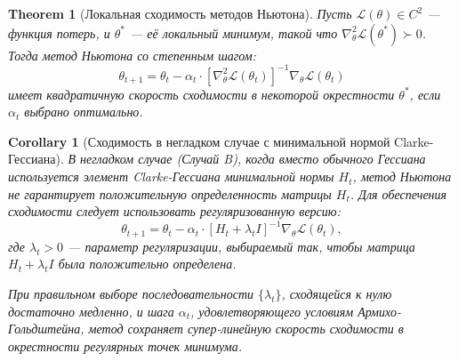 \documentclass[11pt]{article}
\newtheorem{theorem}{Theorem}
\newtheorem{corollary}{Corollary}
\begin{document}
\begin{theorem}[Локальная сходимость методов Ньютона]
  Пусть $\mathcal{L}(\theta) \in C^2$ — функция потерь, и $\theta^*$ — её локальный минимум, такой что
  $\nabla^2_\theta \mathcal{L}(\theta^*) \succ 0$. Тогда метод Ньютона со степенным шагом:
  \[
    \theta_{t+1} = \theta_t - \alpha_t \cdot [\nabla^2_\theta \mathcal{L}(\theta_t)]^{-1} \nabla_\theta
    \mathcal{L}(\theta_t)
  \]
  имеет квадратичную скорость сходимости в некоторой окрестности $\theta^*$, если $\alpha_t$ выбрано оптимально.
\end{theorem}

\begin{corollary}[Сходимость в негладком случае с минимальной нормой Clarke-Гессиана]
  В негладком случае (Случай B), когда вместо обычного Гессиана используется элемент Clarke-Гессиана
  минимальной нормы $H_t$, метод Ньютона не гарантирует положительную определенность матрицы $H_t$. Для
  обеспечения сходимости следует использовать регуляризованную версию:
  \[
    \theta_{t+1} = \theta_t - \alpha_t \cdot [H_t + \lambda_t I]^{-1} \nabla_\theta \mathcal{L}(\theta_t),
  \]
  где $\lambda_t > 0$ — параметр регуляризации, выбираемый так, чтобы матрица $H_t + \lambda_t I$ была
  положительно определена.

  При правильном выборе последовательности $\{\lambda_t\}$, сходящейся к нулю достаточно медленно, и шага
  $\alpha_t$, удовлетворяющего условиям Армихо-Гольдштейна, метод сохраняет супер-линейную скорость
  сходимости в окрестности регулярных точек минимума.
\end{corollary}
\end{document}
